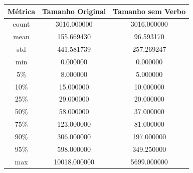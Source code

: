 \begin{center}
    \begin{tabular}{|c|c|c|}
        \hline
        Métrica & Tamanho Original & Tamanho sem Verbo \\
        \hline
        count & 3016.000000 & 3016.000000 \\
        \hline
        mean & 155.669430 & 96.593170 \\
        \hline
        std & 441.581739 & 257.269247 \\
        \hline
        min & 0.000000 & 0.000000 \\
        \hline
        5\% & 8.000000 & 5.000000 \\
        \hline
        10\% & 15.000000 & 10.000000 \\
        \hline
        25\% & 29.000000 & 20.000000 \\
        \hline
        50\% & 58.000000 & 37.000000 \\
        \hline
        75\% & 123.000000 & 81.000000 \\
        \hline
        90\% & 306.000000 & 197.000000 \\
        \hline
        95\% & 598.000000 & 349.250000 \\
        \hline
        max & 10018.000000 & 5699.000000 \\
        \hline
    \end{tabular}
\end{center}
